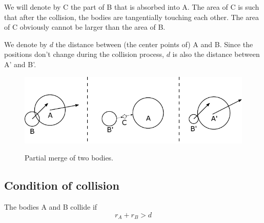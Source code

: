 \documentclass{article}
\begin{document}
We will denote by C the part of B that is absorbed into A. The area of C is such that after the collision, the bodies are tangentially touching each other. The area of C obviously cannot be larger than the area of B.

We denote by $d$ the distance between (the center points of) A and B. Since the positions don't change during the collision process, $d$ is also the distance between A' and B'.

\begin{figure}[h]
	\centering
	{\includegraphics{figures/partial_merge.pdf}}
	\caption{Partial merge of two bodies.}\label{fig:partial_merge}
\end{figure}

\subsection{Condition of collision}
The bodies A and B collide if
\begin{equation}
r_A + r_B > d
\end{equation}
\end{document}
